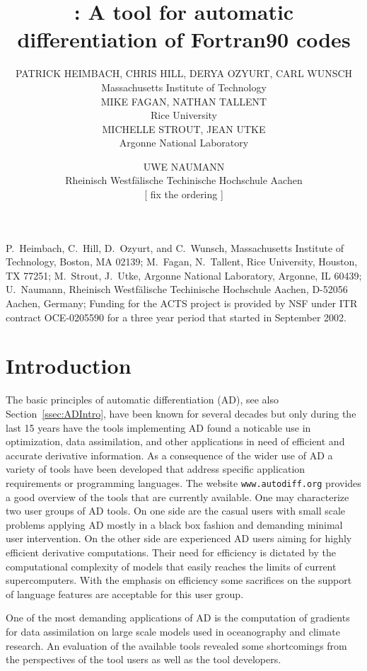 \documentclass[acmtocl,acmnow]{acmtrans2m}
\title{\OpenAD: A tool for automatic differentiation 
of Fortran90 codes}
\author{PATRICK HEIMBACH, CHRIS HILL, DERYA OZYURT, CARL WUNSCH\\Massachusetts Institute of Technology\\
MIKE FAGAN, NATHAN TALLENT \\Rice University\\
MICHELLE STROUT, JEAN UTKE \\Argonne National Laboratory 
\and
UWE NAUMANN\\Rheinisch Westf\"alische Techinische Hochschule Aachen\\
{\color{Red}[ fix the ordering ]}
}
\newcommand{\refsec}[1]{Section~\ref{#1}}
\begin{document}
\begin{bottomstuff} 
P.~Heimbach, C.~Hill, D.~Ozyurt, and C.~Wunsch, Massachusetts Institute of Technology, 
Boston, MA 02139;\newline
M.~Fagan, N.~Tallent, Rice University, 
Houston, TX 77251;\newline
M.~Strout, J.~Utke, Argonne National Laboratory, 
Argonne, IL 60439;\newline
U.~Naumann, Rheinisch Westf\"alische Techinische Hochschule Aachen, 
D-52056 Aachen, Germany;\newline
Funding for the ACTS project is provided by NSF under ITR contract OCE-0205590
for a three year period that started in September 2002.
\end{bottomstuff}
\maketitle

\section{Introduction} \label{sec:Introduction}

The basic principles of automatic differentiation (AD), see also \refsec{ssec:ADIntro}, 
have been known for several decades \cite{wengert}
but only during the last 15 years have the tools implementing AD found a noticable use in 
optimization, data assimilation, and other applications in need of efficient and accurate 
derivative information. 
As a consequence of the wider use of AD 
a variety of tools have been developed that address specific 
application requirements or programming languages. 
The website {\tt www.autodiff.org} provides a good overview of the tools that 
are currently available. 
One may characterize two user groups of AD tools. On one side are the casual users 
with small scale problems applying AD mostly in a black box fashion and demanding 
minimal user intervention. 
On the other side are experienced AD users aiming for highly efficient 
derivative computations. Their need for efficiency is dictated by the 
computational complexity of models that easily reaches the limits of  current 
supercomputers. With the emphasis on efficiency some sacrifices on the support of 
language features are acceptable for this user group. 

One of the most demanding applications of AD is the computation of gradients for 
data assimilation on large scale models used in oceanography and climate research. 
An evaluation of the available tools revealed some shortcomings from the perspectives 
of the tool users as well as the tool developers. 
\end{document}
